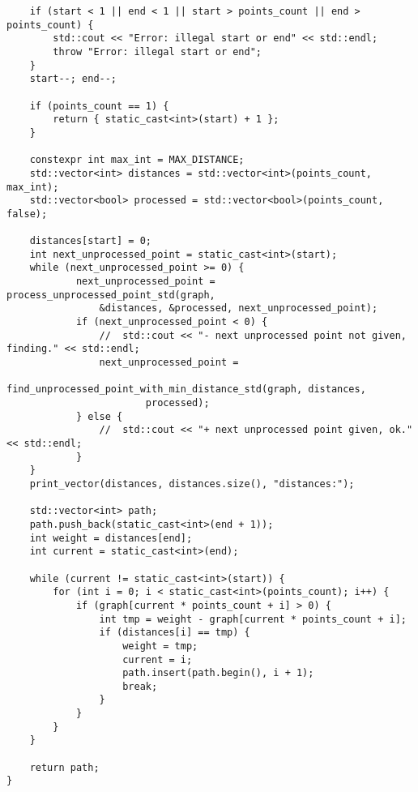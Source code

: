 \documentclass{report}
\begin{document}
\begin{lstlisting}
    if (start < 1 || end < 1 || start > points_count || end > points_count) {
        std::cout << "Error: illegal start or end" << std::endl;
        throw "Error: illegal start or end";
    }
    start--; end--;

    if (points_count == 1) {
        return { static_cast<int>(start) + 1 };
    }

    constexpr int max_int = MAX_DISTANCE;
    std::vector<int> distances = std::vector<int>(points_count, max_int);
    std::vector<bool> processed = std::vector<bool>(points_count, false);

    distances[start] = 0;
    int next_unprocessed_point = static_cast<int>(start);
    while (next_unprocessed_point >= 0) {
            next_unprocessed_point = process_unprocessed_point_std(graph,
                &distances, &processed, next_unprocessed_point);
            if (next_unprocessed_point < 0) {
                //  std::cout << "- next unprocessed point not given, finding." << std::endl;
                next_unprocessed_point =
                    find_unprocessed_point_with_min_distance_std(graph, distances,
                        processed);
            } else {
                //  std::cout << "+ next unprocessed point given, ok." << std::endl;
            }
    }
    print_vector(distances, distances.size(), "distances:");

    std::vector<int> path;
    path.push_back(static_cast<int>(end + 1));
    int weight = distances[end];
    int current = static_cast<int>(end);

    while (current != static_cast<int>(start)) {
        for (int i = 0; i < static_cast<int>(points_count); i++) {
            if (graph[current * points_count + i] > 0) {
                int tmp = weight - graph[current * points_count + i];
                if (distances[i] == tmp) {
                    weight = tmp;
                    current = i;
                    path.insert(path.begin(), i + 1);
                    break;
                }
            }
        }
    }

    return path;
}
\end{lstlisting}
\end{document}
